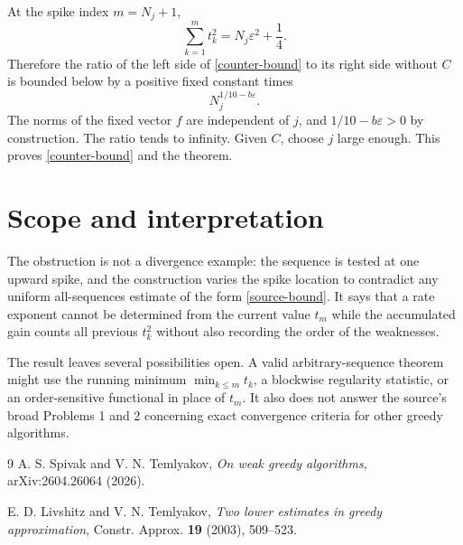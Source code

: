 \documentclass[11pt]{article}
\begin{document}
At the spike index $m=N_j+1$,
\[
 \sum_{k=1}^{m}t_k^2=N_j\varepsilon^2+\frac14.
\]
Therefore the ratio of the left side of \eqref{counter-bound} to its right
side without $C$ is bounded below by a positive fixed constant times
\[
 N_j^{1/10-b\varepsilon}.
\]
The norms of the fixed vector $f$ are independent of $j$, and
$1/10-b\varepsilon>0$ by construction. The ratio tends to infinity. Given
$C$, choose $j$ large enough. This proves \eqref{counter-bound} and the
theorem.

\section{Scope and interpretation}

The obstruction is not a divergence example: the sequence is tested at one
upward spike, and the construction varies the spike location to contradict
any uniform all-sequences estimate of the form \eqref{source-bound}. It says
that a rate exponent cannot be determined from the current value $t_m$ while
the accumulated gain counts all previous $t_k^2$ without also recording the
order of the weaknesses.

The result leaves several possibilities open. A valid arbitrary-sequence
theorem might use the running minimum $\min_{k\leq m}t_k$, a blockwise
regularity statistic, or an order-sensitive functional in place of $t_m$.
It also does not answer the source's broad Problems 1 and 2 concerning exact
convergence criteria for other greedy algorithms.

\begin{thebibliography}{9}
A. S. Spivak and V. N. Temlyakov,
\emph{On weak greedy algorithms}, arXiv:2604.26064 (2026).

E. D. Livshitz and V. N. Temlyakov,
\emph{Two lower estimates in greedy approximation},
Constr. Approx. \textbf{19} (2003), 509--523.
\end{thebibliography}
\end{document}

